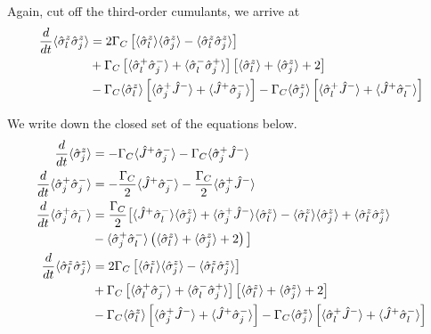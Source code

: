 \documentclass{article}
\newcommand{\gc}{\Gamma_C}
\begin{document}
Again, cut off the third-order cumulants, we arrive at
\begin{align}
\notag
\frac{d}{dt}\langle\hat{\sigma}_l^z \hat{\sigma}_j^z\rangle&=2\gc\left[\langle\hat{\sigma}_l^z\rangle \langle \hat{\sigma}_j^z\rangle-\langle\hat{\sigma}_l^z \hat{\sigma}_j^z\rangle\right]\\\notag
&+\gc\left[\langle\hat{\sigma}_l^+\hat{\sigma}_j^-\rangle+\langle\hat{\sigma}_l^-\hat{\sigma}_j^+\rangle\right]\left[\langle\hat{\sigma}_l^z\rangle+\langle \hat{\sigma}_j^z\rangle+2\right]\\
&-\gc\langle\hat{\sigma}_l^z\rangle\left[\langle\hat{\sigma}_j^+\hat{J}^-\rangle+\langle\hat{J}^+\hat{\sigma}_j^-\rangle\right]-\gc\langle\hat{\sigma}_j^z\rangle\left[\langle\hat{\sigma}_l^+\hat{J}^-\rangle+\langle\hat{J}^+\hat{\sigma}_l^-\rangle\right]
\end{align}

We write down the closed set of the equations below.
\begin{align}
\label{de1}
\frac{d}{dt}\langle\hat{\sigma}^z_j\rangle&=-\gc\langle\hat{J}^+\hat{\sigma}^-_j\rangle-\gc\langle\hat{\sigma}_j^+\hat{J}^-\rangle\\
\label{de2}
\frac{d}{dt}\langle\hat{\sigma}^+_j\hat{\sigma}^-_j\rangle&=-\frac{\gc}{2}\langle\hat{J}^+\hat{\sigma}^-_j\rangle-\frac{\gc}{2}\langle\hat{\sigma}_j^+\hat{J}^-\rangle\\\notag
\frac{d}{dt}\langle\hat{\sigma}^+_j\hat{\sigma}^-_l\rangle&=\frac{\gc}{2}\big[\langle\hat{J}^+\hat{\sigma}_l^-\rangle \langle \hat{\sigma}_j^z\rangle+\langle\hat{\sigma}^+_j\hat{J}^-\rangle \langle \hat{\sigma}_l^z\rangle-\langle\hat{\sigma}_l^z\rangle \langle \hat{\sigma}_j^z\rangle+\langle\hat{\sigma}_l^z \hat{\sigma}_j^z\rangle\\
\label{de3}
&-\langle\hat{\sigma}_j^+ \hat{\sigma}_l^-\rangle\left(\langle\hat{\sigma}_l^z\rangle +\langle \hat{\sigma}_j^z\rangle+2\right)\big]\\\notag
\frac{d}{dt}\langle\hat{\sigma}_l^z \hat{\sigma}_j^z\rangle&=2\gc\left[\langle\hat{\sigma}_l^z\rangle \langle \hat{\sigma}_j^z\rangle-\langle\hat{\sigma}_l^z \hat{\sigma}_j^z\rangle\right]\\\notag
&+\gc\left[\langle\hat{\sigma}_l^+\hat{\sigma}_j^-\rangle+\langle\hat{\sigma}_l^-\hat{\sigma}_j^+\rangle\right]\left[\langle\hat{\sigma}_l^z\rangle+\langle \hat{\sigma}_j^z\rangle+2\right]\\
\label{de4}
&-\gc\langle\hat{\sigma}_l^z\rangle\left[\langle\hat{\sigma}_j^+\hat{J}^-\rangle+\langle\hat{J}^+\hat{\sigma}_j^-\rangle\right]-\gc\langle\hat{\sigma}_j^z\rangle\left[\langle\hat{\sigma}_l^+\hat{J}^-\rangle+\langle\hat{J}^+\hat{\sigma}_l^-\rangle\right]
\end{align}
\end{document}
